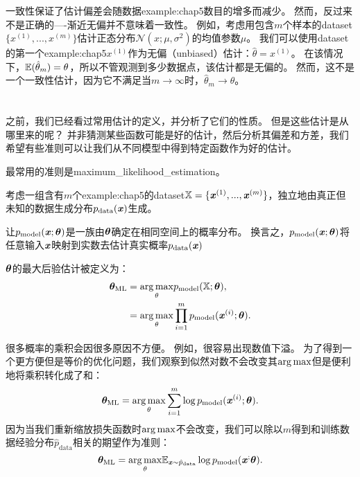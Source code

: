 一致性保证了估计偏差会随数据\gls{example:chap5}数目的增多而减少。
然而，反过来不是正确的----渐近无偏并不意味着一致性。
例如，考虑用包含$m$个样本的\gls{dataset}$\{x^{(1)},...,x^{(m)}\}$估计正态分布$\mathcal{N}(x;\mu,\sigma^2)$的均值参数$\mu$。
我们可以使用\gls{dataset}的第一个\gls{example:chap5}$x^{(1)}$作为无偏（unbiased）估计：$\hat{\theta} = x^{(1)}$。
在该情况下，$\mathbb{E}(\hat{\theta}_m) = \theta$，所以不管观测到多少数据点，该估计都是无偏的。
然而，这不是一个一致性估计，因为它不满足当$m\to\infty$时，$\hat{\theta}_m \to \theta$。


\section{}
\label{sec:maximum_likelihood_estimation}
之前，我们已经看过常用估计的定义，并分析了它们的性质。
但是这些估计是从哪里来的呢？
并非猜测某些函数可能是好的估计，然后分析其偏差和方差，我们希望有些准则可以让我们从不同模型中得到特定函数作为好的估计。

最常用的准则是\gls{maximum_likelihood_estimation}。

考虑一组含有$m$个\gls{example:chap5}的\gls{dataset}$\mathbb{X}=\{ \boldsymbol{\mathit{x}}^{(1)},..., \boldsymbol{\mathit{x}}^{(m)} \}$，独立地由真正但未知的数据生成分布$p_{\text{data}}(\boldsymbol{\mathit{x}})$生成。

让$p_{\text{model}}( \boldsymbol{\mathit{x}}; \boldsymbol{\theta} )$是一族由$\boldsymbol{\theta}$确定在相同空间上的概率分布。
换言之，$p_{\text{model}}(\boldsymbol{\mathit{x}};\boldsymbol{\theta})$将任意输入$\boldsymbol{\mathit{x}}$映射到实数去估计真实概率$p_{\text{data}}(\boldsymbol{\mathit{x}})$

 $\boldsymbol{\theta}$的最大后验估计被定义为：
\begin{align}
    \boldsymbol{\theta}_{\text{ML}} &= \underset{\theta}{\arg\max} p_{\text{model}} (\mathbb{X}; \boldsymbol{\theta}), \\
        &= \underset{\theta}{\arg\max} \prod_{i=1}^m p_{\text{model}} (\boldsymbol{\mathit{x}}^{(i)}; \boldsymbol{\theta}).
\end{align}

很多概率的乘积会因很多原因不方便。
例如，很容易出现数值下溢。
为了得到一个更方便但是等价的优化问题，我们观察到似然对数不会改变其$\arg\max$但是便利地将乘积转化成了和：
\begin{equation}
    \boldsymbol{\theta}_{\text{ML}} = \underset{\theta}{\arg\max} \sum_{i=1}^m \log p_{\text{model}} (\boldsymbol{\mathit{x}}^{(i)}; \boldsymbol{\theta}) .
\end{equation}
因为当我们重新缩放损失函数时$\arg\max$不会改变，我们可以除以$m$得到和训练数据经验分布$\hat{p}_{\text{data}}$相关的期望作为准则：
\begin{equation}
\label{eq:5.59}
    \boldsymbol{\theta}_{\text{ML}} = \underset{\theta}{\arg\max} \mathbb{E}_{\boldsymbol{\mathit{x}} \sim \hat{p}_{\text{data}}} \log p_{\text{model}} (\boldsymbol{\mathit{x}}^; \boldsymbol{\theta}) .
\end{equation}

